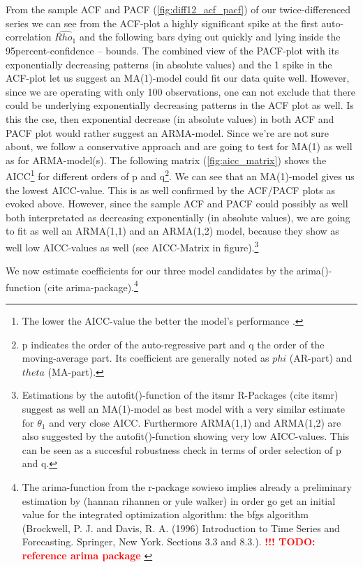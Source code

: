 \documentclass[11pt,a4paper]{article}
\newcommand{\TODO}[1]{%
    \textcolor{red}{%
        \textbf{!!! TODO: #1}%
    }%
    \PackageWarning{TODO:}{TODO: #1}%
}
\begin{document}
From the sample ACF and PACF (\cref{fig:diff12_acf_pacf}) of our twice-differenced series we can see from the ACF-plot a highly significant spike at the first auto-correlation $\hat{Rho_1}$ and the following bars dying out quickly and lying inside the 95percent-confidence – bounds.
The combined view of the PACF-plot with its exponentially decreasing patterns (in absolute values) and the 1 spike in the ACF-plot let us suggest an MA(1)-model could fit our data quite well.
However, since we are operating with only 100 observations, one can not exclude that there could be underlying exponentially decreasing patterns in the ACF plot as well.
Is this the cse, then exponential decrease (in absolute values) in both ACF and PACF plot would rather suggest an ARMA-model.
Since  we’re are not sure about, we follow a conservative approach and are going to test for MA(1) as well as for ARMA-model(s).
The following matrix (\cref{fig:aicc_matrix}) shows the AICC\footnote{
    The lower the AICC-value the better the model's performance \citep{aic86}.
} for different orders of p and q\footnote{
    p indicates the order of the auto-regressive part and q the order of the moving-average part.
    Its coefficient are generally noted as $phi$ (AR-part) and $theta$ (MA-part).
}.
We can see that an MA(1)-model gives us the lowest AICC-value.
This is as well confirmed by the ACF/PACF plots as evoked above.
However, since the sample ACF and PACF could possibly as well both interpretated as decreasing exponentially (in absolute values), we are going to fit as well an ARMA(1,1) and an ARMA(1,2) model, because they show as well low AICC-values as well (see AICC-Matrix in figure).\footnote{
    Estimations by the autofit()-function of the itsmr R-Packages (cite itsmr) suggest as well an MA(1)-model as best model with a very similar estimate for $\theta_1$ and very close AICC.
    Furthermore ARMA(1,1) and ARMA(1,2) are also suggested by the autofit()-function showing very low AICC-values.
    This can be seen as a succesful robustness check in terms of order selection of p and q.
}

We now estimate coefficients for our three model candidates by the arima()-function (cite arima-package).\footnote{
    The arima-function from the r-package sowieso implies already a preliminary estimation by (hannan rihannen or yule walker) in order go get an initial value for the integrated optimization algorithm:
    the bfgs algorithm (Brockwell, P. J. and Davis, R. A. (1996) Introduction to Time Series and Forecasting. Springer, New York. Sections 3.3 and 8.3.).
    \TODO{reference arima package}
}
\end{document}
